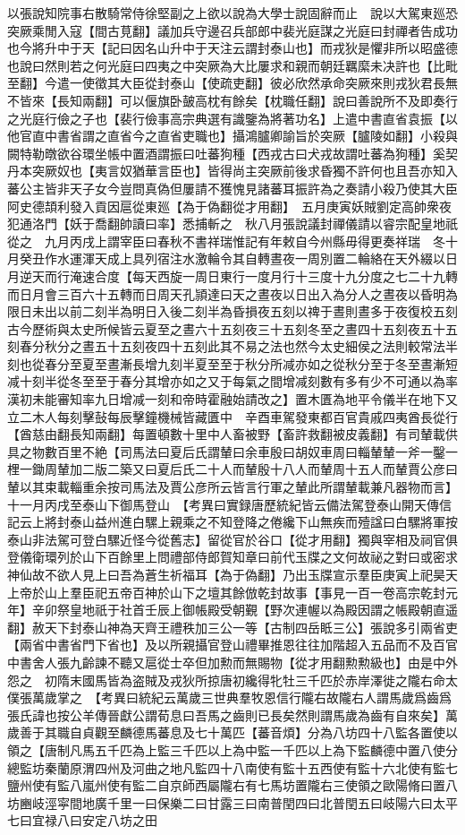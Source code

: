 以張說知院事右散騎常侍徐堅副之上欲以說為大學士說固辭而止　說以大駕東廵恐突厥乘閒入寇【間古莧翻】議加兵守邊召兵部郎中裴光庭謀之光庭曰封禪者告成功也今將升中于天【記曰因名山升中于天注云謂封泰山也】而戎狄是懼非所以昭盛德也說曰然則若之何光庭曰四夷之中突厥為大比屢求和親而朝廷羈縻未决許也【比毗至翻】今遣一使徵其大臣從封泰山【使疏吏翻】彼必欣然承命突厥來則戎狄君長無不皆來【長知兩翻】可以偃旗卧皷高枕有餘矣【枕職任翻】說曰善說所不及即奏行之光庭行儉之子也【裴行儉事高宗典選有識鑒為將著功名】上遣中書直省袁振【以他官直中書省謂之直省今之直省吏職也】攝鴻臚卿諭旨於突厥【臚陵如翻】小殺與闕特勒暾欲谷環坐帳中置酒謂振曰吐蕃狗種【西戎古曰犬戎故謂吐蕃為狗種】奚契丹本突厥奴也【夷言奴猶華言臣也】皆得尚主突厥前後求昏獨不許何也且吾亦知入蕃公主皆非天子女今豈問真偽但屢請不獲愧見諸蕃耳振許為之奏請小殺乃使其大臣阿史德頡利發入貢因扈從東廵【為于偽翻從才用翻】　五月庚寅妖賊劉定高帥衆夜犯通洛門【妖于喬翻帥讀曰率】悉捕斬之　秋八月張說議封禪儀請以睿宗配皇地祇從之　九月丙戌上謂宰臣曰春秋不書祥瑞惟記有年敕自今州縣毋得更奏祥瑞　冬十月癸丑作水運渾天成上具列宿注水激輪令其自轉晝夜一周別置二輪絡在天外綴以日月逆天而行淹速合度【每天西旋一周日東行一度月行十三度十九分度之七二十九轉而日月會三百六十五轉而日周天孔頴達曰天之晝夜以日出入為分人之晝夜以昏明為限日未出以前二刻半為明日入後二刻半為昏損夜五刻以禆于晝則晝多于夜復校五刻古今歷術與太史所候皆云夏至之晝六十五刻夜三十五刻冬至之晝四十五刻夜五十五刻春分秋分之晝五十五刻夜四十五刻此其不易之法也然今太史細侯之法則較常法半刻也從春分至夏至晝漸長增九刻半夏至至于秋分所减亦如之從秋分至于冬至晝漸短减十刻半從冬至至于春分其增亦如之又于每氣之間增减刻數有多有少不可通以為率漢初未能審知率九日增减一刻和帝時霍融始請改之】置木匱為地平令儀半在地下又立二木人每刻擊鼔每辰擊鐘機械皆藏匱中　辛酉車駕發東都百官貴戚四夷酋長從行【酋慈由翻長知兩翻】每置頓數十里中人畜被野【畜許救翻被皮義翻】有司輦載供具之物數百里不絶【司馬法曰夏后氏謂輦曰余車殷曰胡奴車周曰輜輦輦一斧一鑿一梩一鋤周輦加二版二築又曰夏后氏二十人而輦殷十八人而輦周十五人而輦賈公彦曰輦以其束載輜重余按司馬法及賈公彦所云皆言行軍之輦此所謂輦載兼凡器物而言】十一月丙戌至泰山下御馬登山　【考異曰實録唐歷統紀皆云備法駕登泰山開天傳信記云上將封泰山益州進白騾上親乘之不知登降之倦纔下山無疾而殪諡曰白騾將軍按泰山非法駕可登白騾近怪今從舊志】留從官於谷口【從才用翻】獨與宰相及祠官俱登儀衛環列於山下百餘里上問禮部侍郎賀知章曰前代玉牒之文何故祕之對曰或密求神仙故不欲人見上曰吾為蒼生祈福耳【為于偽翻】乃出玉牒宣示羣臣庚寅上祀昊天上帝於山上羣臣祀五帝百神於山下之壇其餘倣乾封故事【事見一百一卷高宗乾封元年】辛卯祭皇地祇于社首壬辰上御帳殿受朝覲【野次連幄以為殿因謂之帳殿朝直遥翻】赦天下封泰山神為天齊王禮秩加三公一等【古制四岳眡三公】張說多引兩省吏【兩省中書省門下省也】及以所親攝官登山禮畢推恩往往加階超入五品而不及百官中書舍人張九齡諫不聽又扈從士卒但加勲而無賜物【從才用翻勲勲級也】由是中外怨之　初隋末國馬皆為盗賊及戎狄所掠唐初纔得牝牡三千匹於赤岸澤徙之隴右命太僕張萬歲掌之　【考異曰統紀云萬歲三世典羣牧恩信行隴右故隴右人謂馬歲爲齒爲張氏諱也按公羊傳晉獻公謂荀息曰吾馬之齒則已長矣然則謂馬歲為齒有自來矣】萬歲善于其職自貞觀至麟德馬蕃息及七十萬匹【蕃音煩】分為八坊四十八監各置使以領之【唐制凡馬五千匹為上監三千匹以上為中監一千匹以上為下監麟德中置八使分總監坊秦蘭原渭四州及河曲之地凡監四十八南使有監十五西使有監十六北使有監七鹽州使有監八嵐州使有監二自京師西屬隴右有七馬坊置隴右三使領之歐陽脩曰置八坊豳岐涇寜間地廣千里一曰保樂二曰甘露三曰南普閏四曰北普閏五曰岐陽六曰太平七曰宜禄八曰安定八坊之田
